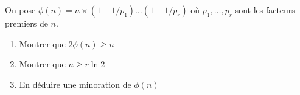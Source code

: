 
On pose $\phi(n) = n \times (1 - 1/p_1) \dots (1 - 1 / p_r)$
où $p_1, \dots, p_r$ sont les facteurs premiers de $n$.

\begin{enumerate}
    \item Montrer que $2 \phi(n) \geq n$
    \item Montrer que $n \geq r \ln 2$
    \item En déduire une minoration de $\phi(n)$
\end{enumerate}



